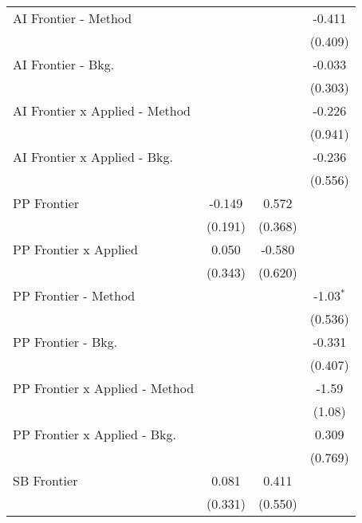 \begin{tabular}{lccc}
   AI Frontier - Method           &               &               & -0.411\\   
                                  &               &               & (0.409)\\   
   AI Frontier - Bkg.             &               &               & -0.033\\   
                                  &               &               & (0.303)\\   
   AI Frontier x Applied - Method &               &               & -0.226\\   
                                  &               &               & (0.941)\\   
   AI Frontier x Applied - Bkg.   &               &               & -0.236\\   
                                  &               &               & (0.556)\\   
   PP Frontier                    & -0.149        & 0.572         &   \\   
                                  & (0.191)       & (0.368)       &   \\   
   PP Frontier x Applied          & 0.050         & -0.580        &   \\   
                                  & (0.343)       & (0.620)       &   \\   
   PP Frontier - Method           &               &               & -1.03$^{*}$\\   
                                  &               &               & (0.536)\\   
   PP Frontier - Bkg.             &               &               & -0.331\\   
                                  &               &               & (0.407)\\   
   PP Frontier x Applied - Method &               &               & -1.59\\   
                                  &               &               & (1.08)\\   
   PP Frontier x Applied - Bkg.   &               &               & 0.309\\   
                                  &               &               & (0.769)\\   
   SB Frontier                    & 0.081         & 0.411         &   \\   
                                  & (0.331)       & (0.550)       &   \\   

\end{tabular}
